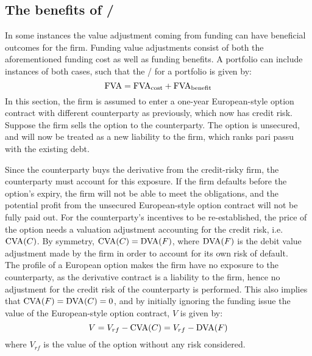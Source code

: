 \documentclass[../main.tex]{subfiles}
\begin{document}
    \subsection{The benefits of \FVA/}
        In some instances the value adjustment coming from funding can have beneficial outcomes for the firm. 
        Funding value adjustments consist of both the aforementioned funding cost as well as funding benefits. 
        A portfolio can include instances of both cases, such that the \FVA/ for a portfolio is given by:
        \begin{equation}
            \text{\FVA/} = \text{\FVA/}_{\text{cost}} + \text{\FVA/}_{\text{benefit}}
        \end{equation}
        In this section, the firm is assumed to enter a one-year European-style option contract 
        with different counterparty as previously,
        which now has credit risk.
        Suppose the firm sells the option to the counterparty. 
        The option is unsecured, and will now be treated as a new liability to the firm, 
        which ranks pari passu with the existing debt.

        Since the counterparty buys the derivative from the credit-risky firm, 
        the counterparty must account for this exposure. 
        If the firm defaults before the option's expiry, the firm will not be able to meet the obligations, 
        and the potential profit from the unsecured European-style option contract will not be fully paid out. 
        For the counterparty's incentives to be re-established, 
        the price of the option needs a valuation adjustment accounting for the credit risk, i.e. $\text{\CVA/}(C)$. 
        By symmetry, $\text{\CVA/}(C) = \text{\DVA/}(F)$, 
        where $\text{\DVA/}(F)$ is the debit value adjustment made by the firm 
        in order to account for its own risk of default.\\
        The profile of a European option makes the firm have no exposure to the counterparty, 
        as the derivative contract is a liability to the firm, 
        hence no adjustment for the credit risk of the counterparty is performed. 
        This also implies that $\text{\CVA/}(F) = \text{\DVA/}(C) = 0$, 
        and by initially ignoring the funding issue the value of the European-style option contract, $V$ is given by:
        \begin{equation}\label{eqn:option-value-credit-risk}
            V = V_{rf} - \text{\CVA/}(C) = V_{rf} - \text{\DVA/}(F)
        \end{equation}
        where $V_{rf}$ is the value of the option without any risk considered.
\end{document}
